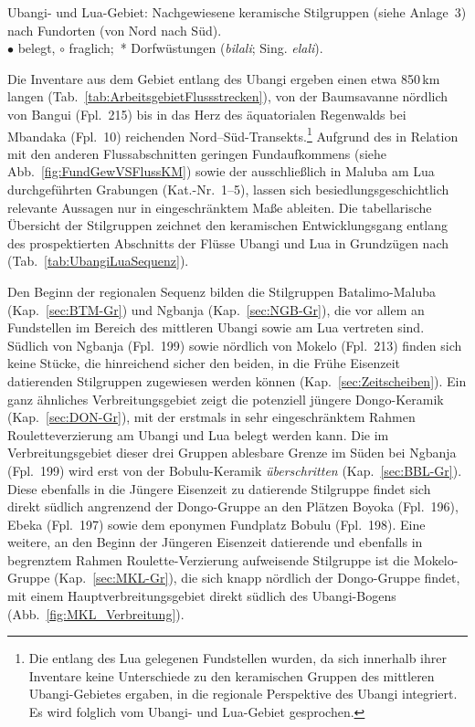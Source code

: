 \begin{table*}[!tb]
	\centering
	\resizebox{1.02\textwidth}{!}{%
		{\footnotesize 
	
		}
	}
	\caption{\mbox{Ubangi}- und Lua-Gebiet: Nachgewiesene keramische Stilgruppen (siehe Anlage~3) nach Fundorten (von Nord nach Süd).\\$\bullet$ belegt, $\circ$ fraglich;~* Dorfwüstungen (\textit{bilali}; Sing. \textit{elali}).}
	\label{tab:UbangiLuaSequenz}
\end{table*}

Die Inventare aus dem Gebiet entlang des \mbox{Ubangi} ergeben einen etwa 850\,km langen (Tab.~\ref{tab:ArbeitsgebietFlussstrecken}), von der Baumsavanne nördlich von Bangui (Fpl.~215) bis in das Herz des äquatorialen Regenwalds bei Mbandaka (Fpl.~10) reichenden Nord--Süd-Transekts.\footnote{Die entlang des Lua gelegenen Fundstellen wurden, da sich innerhalb ihrer Inventare keine Unterschiede zu den keramischen Gruppen des mittleren \mbox{Ubangi}-Gebietes ergaben, in die regionale Perspektive des \mbox{Ubangi} integriert. Es wird folglich vom \mbox{Ubangi}- und Lua-Gebiet gesprochen.} Aufgrund des in Relation mit den anderen Flussabschnitten geringen Fundaufkommens (siehe Abb.~\ref{fig:FundGewVSFlussKM}) sowie der ausschließlich in Maluba am Lua durchgeführten Grabungen (Kat.-Nr.~1--5), lassen sich besiedlungsgeschichtlich relevante Aussagen nur in eingeschränktem Maße ableiten. Die tabellarische Übersicht der Stilgruppen zeichnet den keramischen Entwicklungsgang entlang des prospektierten Abschnitts der Flüsse \mbox{Ubangi} und Lua in Grundzügen nach (Tab.~\ref{tab:UbangiLuaSequenz}).

Den Beginn der regionalen Sequenz bilden die Stilgruppen Batalimo-Maluba (Kap.~\ref{sec:BTM-Gr}) und \mbox{Ngbanja} (Kap.~\ref{sec:NGB-Gr}), die vor allem an Fundstellen im Bereich des mittleren \mbox{Ubangi} sowie am Lua vertreten sind. Südlich von \mbox{Ngbanja} (Fpl.~199) sowie nördlich von Mokelo (Fpl.~213) finden sich keine Stücke, die hinreichend sicher den beiden, in die Frühe Eisenzeit datierenden Stilgruppen zugewiesen werden können (Kap.~\ref{sec:Zeitscheiben}). Ein ganz ähnliches Verbreitungsgebiet zeigt die potenziell jüngere Dongo-Keramik (Kap.~\ref{sec:DON-Gr}), mit der erstmals in sehr eingeschränktem Rahmen Rouletteverzierung am \mbox{Ubangi} und Lua belegt werden kann. Die im Verbreitungsgebiet dieser drei Gruppen ablesbare Grenze im Süden bei \mbox{Ngbanja} (Fpl.~199) wird erst von der Bobulu-Keramik \textit{überschritten} (Kap.~\ref{sec:BBL-Gr}). Diese ebenfalls in die Jüngere Eisenzeit zu datierende Stilgruppe findet sich direkt südlich angrenzend der Dongo-Gruppe an den Plätzen Boyoka (Fpl.~196), Ebeka (Fpl.~197) sowie dem eponymen Fundplatz Bobulu (Fpl.~198). Eine weitere, an den Beginn der Jüngeren Eisenzeit datierende und ebenfalls in begrenztem Rahmen Roulette-Verzierung aufweisende Stilgruppe ist die Mokelo-Gruppe (Kap.~\ref{sec:MKL-Gr}), die sich knapp nördlich der Dongo-Gruppe findet, mit einem Hauptverbreitungsgebiet direkt südlich des \mbox{Ubangi}-Bogens (Abb.~\ref{fig:MKL_Verbreitung}).\pagebreak

